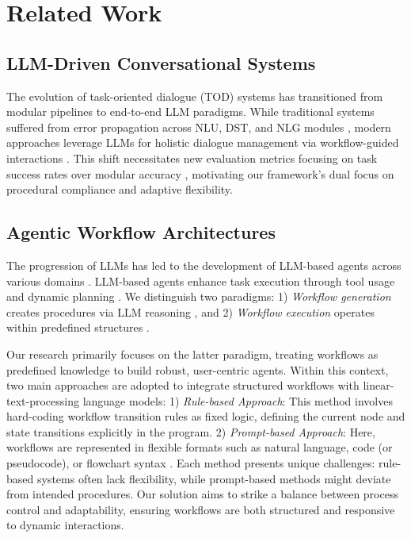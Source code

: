 \section{Related Work}
\subsection{LLM-Driven Conversational Systems} \label{subsec:llm-tod} 
The evolution of task-oriented dialogue (TOD) systems has transitioned from modular pipelines \citep{LLM-dialogue-survey} to end-to-end LLM paradigms. While traditional systems suffered from error propagation across NLU, DST, and NLG modules \citep{SPACE-3,PPTOD}, modern approaches leverage LLMs for holistic dialogue management via workflow-guided interactions \citep{FlowBench,SystemPrompt}. 
This shift necessitates new evaluation metrics focusing on task success rates over modular accuracy \citep{DAG-test-gen}, motivating our framework's dual focus on procedural compliance and adaptive flexibility.


\subsection{Agentic Workflow Architectures} 
The progression of LLMs has led to the development of LLM-based agents across various domains \citep{GenerativeAgents,MedAgents,ChatDev}.
LLM-based agents enhance task execution through tool usage and dynamic planning \citep{ReAct,Toolformer,KnowledGPT,KnowAgent}. We distinguish two paradigms: 1) \emph{Workflow generation} creates procedures via LLM reasoning \citep{AutoFlow,CoRE,LLM+P,AutoAgents,PlanBench}, and 2) \emph{Workflow execution} operates within predefined structures \citep{FlowBench,WorFBench}. 

Our research primarily focuses on the latter paradigm, treating workflows as predefined knowledge to build robust, user-centric agents. Within this context, two main approaches are adopted to integrate structured workflows with linear-text-processing language models: 
1) \emph{Rule-based Approach}: This method involves hard-coding workflow transition rules as fixed logic, defining the current node and state transitions explicitly in the program.
2) \emph{Prompt-based Approach}: Here, workflows are represented in flexible formats such as natural language, code (or pseudocode), or flowchart syntax \citep{FlowBench,KnowAgent}.
Each method presents unique challenges: rule-based systems often lack flexibility, while prompt-based methods might deviate from intended procedures. Our solution aims to strike a balance between process control and adaptability, ensuring workflows are both structured and responsive to dynamic interactions.